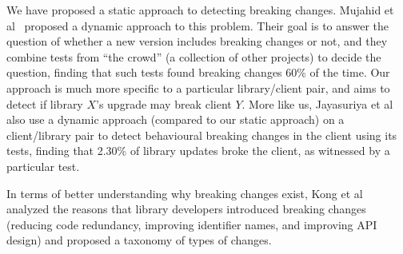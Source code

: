We have proposed a static approach to detecting breaking changes. Mujahid et al~\cite{mujahid20:_using_other_tests_ident_break_updat} proposed a dynamic approach to this problem. Their goal is to answer the question of whether a new version includes breaking changes or not, and they combine tests from ``the crowd'' (a collection of other projects) to decide the question, finding that such tests found breaking changes 60\% of the time. Our approach is much more specific to a particular library/client pair, and aims to detect if library $X$'s upgrade may break client $Y$. More like us, Jayasuriya et al~\cite{jayasuriya24:_under_apis} also use a dynamic approach (compared to our static approach) on a client/library pair to detect behavioural breaking changes in the client using its tests, finding that 2.30\% of library updates broke the client, as witnessed by a particular test.

In terms of better understanding why breaking changes exist, Kong et al~\cite{kong25:_towar_better_compr_break_chang_npm_ecosy} analyzed the reasons that library developers introduced breaking changes (reducing code redundancy, improving identifier names, and improving API design) and proposed a taxonomy of types of changes.
